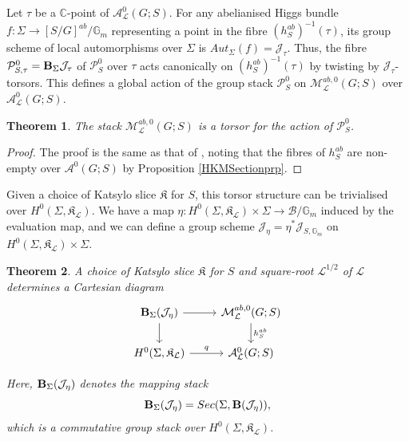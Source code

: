 \documentclass{amsart}
\newtheorem{theorem}{Theorem}
\theoremstyle{remark}
\numberwithin{theorem}{section}
\numberwithin{equation}{section}
\begin{document}
Let $\tau$ be a $\mathbb{C}$-point of $\mathcal A_\mathcal L^0(G;S)$. For any abelianised Higgs bundle $f:\Sigma \rightarrow [S/G]^{ab}/\mathbb{G}_m$ representing a point in the fibre $(h_S^{ab})^{-1}(\tau)$, its group scheme of local automorphisms over $\Sigma$ is $Aut_\Sigma(f) =\mathcal J_\tau$. Thus, the fibre $\mathcal P^0_{S,\tau} = {\bf B}_\Sigma \mathcal J_\tau$ of $\mathcal P^0_S$ over $\tau$ acts canonically on $(h_S^{ab})^{-1}(\tau)$ by twisting by $\mathcal J_\tau$-torsors. This defines a global action of the group stack $\mathcal P_S^0$ on $\mathcal M_\mathcal L^{ab,0}(G;S)$ over $\mathcal A_\mathcal L^0(G;S)$.

\begin{theorem}\label{SPicardTorsthm}
    The stack $\mathcal M_\mathcal L^{ab,0}(G;S)$ is a torsor for the action of $\mathcal P_S^0$.
\end{theorem}

\begin{proof}
The proof is the same as that of \cite[Proposition 4.3.3]{Ngo2}, noting that the fibres of $h_S^{ab}$ are non-empty over $\mathcal A^0(G;S)$ by Proposition \ref{HKMSectionprp}.
\end{proof}

Given a choice of Katsylo slice $\mathfrak{K}$ for $S$, this torsor structure can be trivialised over $H^0(\Sigma,\mathfrak{K}_\mathcal L)$. We have a map $\eta:H^0(\Sigma,\mathfrak{K}_\mathcal L) \times \Sigma \rightarrow \mathcal B/\mathbb{G}_m$ induced by the evaluation map, and we can define a group scheme $\mathcal J_\eta = \eta^*\mathcal J_{S, \mathbb{G}_m}$ on $H^0(\Sigma,\mathfrak{K}_\mathcal L) \times \Sigma$.

\begin{theorem}\label{GlobalSHiggsAbnthm}
    A choice of Katsylo slice $\mathfrak{K}$ for $S$ and square-root $\mathcal L^{1/2}$ of $\mathcal L$ determines a Cartesian diagram
  \begin{equation}\label{GlobalSHiggsAbn1eqn}
\begin{tikzcd}
{\bf B}_\Sigma(\mathcal J_{\eta}) \arrow[d] \arrow[r] & \mathcal M^{ab,0}_\mathcal L(G;S) \arrow[d, "h_S^{ab}"] \\
{H^0(\Sigma,\mathfrak{K}_\mathcal L)} \arrow[r, "q"]         & \mathcal A^0_\mathcal L(G;S)                 
\end{tikzcd}
  \end{equation}
  
  Here, ${\bf B}_\Sigma(\mathcal J_{\eta})$ denotes the mapping stack
  \begin{equation}\label{GlobalSHiggsAbn2eqn}
      {\bf B}_\Sigma(\mathcal J_{\eta}) = Sec(\Sigma, {\bf B}(\mathcal J_{\eta})),
  \end{equation}
  which is a commutative group stack over $H^0(\Sigma,\mathfrak{K}_\mathcal L)$.
\end{theorem}
\end{document}

